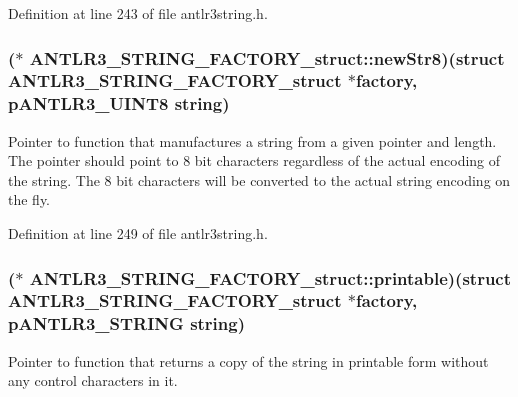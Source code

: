 Definition at line 243 of file antlr3string.\-h.

\hypertarget{struct_a_n_t_l_r3___s_t_r_i_n_g___f_a_c_t_o_r_y__struct_a9ad0272751d44c3651efee31c44088d6}{
\subsubsection[{new\-Str8}]{($\ast$ A\-N\-T\-L\-R3\-\_\-\-S\-T\-R\-I\-N\-G\-\_\-\-F\-A\-C\-T\-O\-R\-Y\-\_\-struct\-::new\-Str8)(struct {\bf A\-N\-T\-L\-R3\-\_\-\-S\-T\-R\-I\-N\-G\-\_\-\-F\-A\-C\-T\-O\-R\-Y\-\_\-struct} $\ast$factory, {\bf p\-A\-N\-T\-L\-R3\-\_\-\-U\-I\-N\-T8} string)}}\label{struct_a_n_t_l_r3___s_t_r_i_n_g___f_a_c_t_o_r_y__struct_a9ad0272751d44c3651efee31c44088d6}
Pointer to function that manufactures a string from a given pointer and length. The pointer should point to 8 bit characters regardless of the actual encoding of the string. The 8 bit characters will be converted to the actual string encoding on the fly. 

Definition at line 249 of file antlr3string.\-h.

\hypertarget{struct_a_n_t_l_r3___s_t_r_i_n_g___f_a_c_t_o_r_y__struct_aed5e6914f4de787d7afd0b2a59b56b0d}{
\subsubsection[{printable}]{($\ast$ A\-N\-T\-L\-R3\-\_\-\-S\-T\-R\-I\-N\-G\-\_\-\-F\-A\-C\-T\-O\-R\-Y\-\_\-struct\-::printable)(struct {\bf A\-N\-T\-L\-R3\-\_\-\-S\-T\-R\-I\-N\-G\-\_\-\-F\-A\-C\-T\-O\-R\-Y\-\_\-struct} $\ast$factory, {\bf p\-A\-N\-T\-L\-R3\-\_\-\-S\-T\-R\-I\-N\-G} string)}}\label{struct_a_n_t_l_r3___s_t_r_i_n_g___f_a_c_t_o_r_y__struct_aed5e6914f4de787d7afd0b2a59b56b0d}
Pointer to function that returns a copy of the string in printable form without any control characters in it. 

